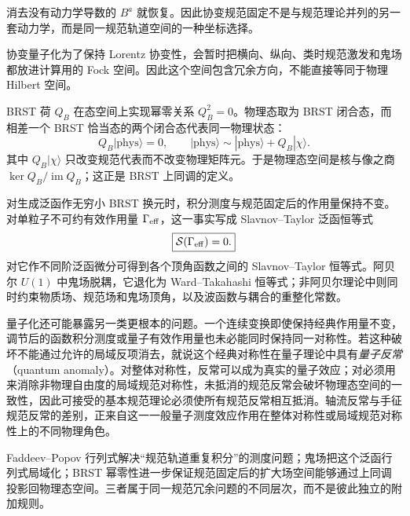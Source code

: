 消去没有动力学导数的 $B^a$ 就恢复。因此协变规范固定不是与规范理论并列的另一套动力学，而是同一规范轨道空间的一种坐标选择。

协变量子化为了保持 Lorentz 协变性，会暂时把横向、纵向、类时规范激发和鬼场都放进计算用的 Fock 空间。因此这个空间包含冗余方向，不能直接等同于物理 Hilbert 空间。

BRST 荷 $Q_B$ 在态空间上实现幂零关系 $Q_B^2=0$。物理态取为 BRST 闭合态，而相差一个 BRST 恰当态的两个闭合态代表同一物理状态：
\begin{equation*}
 Q_B|\mathrm{phys}\rangle=0,
 \qquad
 |\mathrm{phys}\rangle\sim|\mathrm{phys}\rangle+Q_B|\chi\rangle.
\end{equation*}
其中 $Q_B|\chi\rangle$ 只改变规范代表而不改变物理矩阵元。于是物理态空间是核与像之商 $\ker Q_B/\operatorname{im}Q_B$；这正是 BRST 上同调的定义。

对生成泛函作无穷小 BRST 换元时，积分测度与规范固定后的作用量保持不变。对单粒子不可约有效作用量 $\Gamma_{\rm eff}$，这一事实写成 Slavnov--Taylor 泛函恒等式
\begin{equation}
 \boxed{\mathcal S(\Gamma_{\rm eff})=0.}
 \label{eq:st-functional-general-dp11}
\end{equation}
对它作不同阶泛函微分可得到各个顶角函数之间的 Slavnov--Taylor 恒等式。阿贝尔 $U(1)$ 中鬼场脱耦，它退化为 Ward--Takahashi 恒等式；非阿贝尔理论中则同时约束物质场、规范场和鬼场顶角，以及波函数与耦合的重整化常数。

量子化还可能暴露另一类更根本的问题。一个连续变换即使保持经典作用量不变，调节后的函数积分测度或量子有效作用量也未必能同时保持同一对称性。若这种破坏不能通过允许的局域反项消去，就说这个经典对称性在量子理论中具有\emph{量子反常}（quantum anomaly）。对整体对称性，反常可以成为真实的量子效应；对必须用来消除非物理自由度的局域规范对称性，未抵消的规范反常会破坏物理态空间的一致性，因此可接受的基本规范理论必须使所有规范反常相互抵消。轴流反常与手征规范反常的差别，正来自这一一般量子测度效应作用在整体对称性或局域规范对称性上的不同物理角色。

Faddeev--Popov 行列式解决“规范轨道重复积分”的测度问题；鬼场把这个泛函行列式局域化；BRST 幂零性进一步保证规范固定后的扩大场空间能够通过上同调投影回物理态空间。三者属于同一规范冗余问题的不同层次，而不是彼此独立的附加规则。


